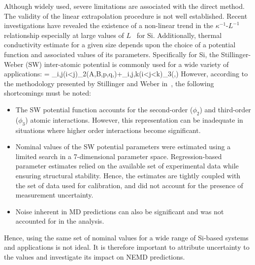 Although widely used, severe limitations are associated with the direct method.
The validity of the linear extrapolation procedure is not well established. Recent
investigations have revealed the existence of a non-linear trend in the $\kappa^{-1}$-$L^{-1}$
relationship especially at large values of $L$~\cite{Sellan:2010} for Si. Additionally, 
thermal conductivity estimate for a given size depends upon the choice of a potential
function and associated values of its parameters. Specifically for Si, the Stillinger-Weber (SW)
inter-atomic potential is commonly used for a wide variety of applications:
%
\be
\Phi = \sum\limits_{i,j(i<j)}\phi_2(A,B,p,q,\alpha)\hspace{1mm}+\sum\limits_{i,j,k(i<j<k)}\phi_3(\lambda,\gamma)
\ee
%
However, according
to the methodology presented by Stillinger and Weber in~\cite{Stillinger:1985},
the following shortcomings must be noted:
%
\begin{itemize}
\item The SW potential function accounts for the second-order ($\phi_2$) and
third-order ($\phi_3$) atomic 
interactions. However, this representation can be inadequate in situations where 
higher order interactions become significant.  
\item Nominal values of the SW potential parameters were estimated using a 
limited search in a 7-dimensional parameter space. Regression-based parameter
estimates relied on the available set of experimental data while ensuring structural
stability. Hence, the estimates are tightly coupled with the set of data used for
calibration, and did not account for the presence of measurement uncertainty. 
\item Noise inherent in MD predictions can also be significant and
was not accounted for in the analysis. 
\end{itemize}
%
Hence, using the same set of nominal values for a wide range of Si-based systems and
applications is not ideal. It is therefore important to attribute uncertainty to the values and
investigate its impact on NEMD predictions. 

